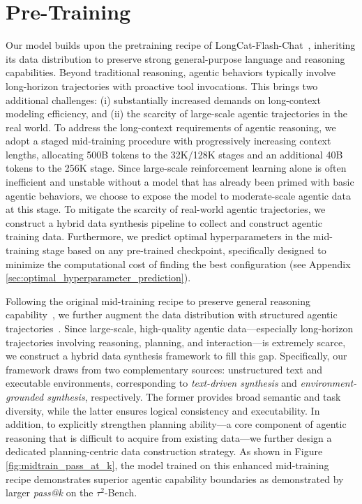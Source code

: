 \documentclass{article}
\begin{document}
\section{Pre-Training}
\label{sec:mid_training}
Our model builds upon the pretraining recipe of LongCat-Flash-Chat~\citep{longcat-flash}, inheriting its data distribution to preserve strong general-purpose language and reasoning capabilities.
Beyond traditional reasoning, agentic behaviors typically involve long-horizon trajectories with proactive tool invocations.
This brings two additional challenges: (i) substantially increased demands on long-context modeling efficiency, and (ii) the scarcity of large-scale agentic trajectories in the real world.
To address the long-context requirements of agentic reasoning, we adopt a staged mid-training procedure with progressively increasing context lengths, allocating 500B tokens to the 32K/128K stages and an additional 40B tokens to the 256K stage.
Since large-scale reinforcement learning alone is often inefficient and unstable without a model that has already been primed with basic agentic behaviors, we choose to expose the model to moderate-scale agentic data at this stage.
To mitigate the scarcity of real-world agentic trajectories, we construct a hybrid data synthesis pipeline to collect and construct agentic training data.
Furthermore, we predict optimal hyperparameters in the mid-training stage based on any pre-trained checkpoint, specifically designed to minimize the computational cost of finding the best configuration (see Appendix \ref{sec:optimal_hyperparameter_prediction}).

Following the original mid-training recipe to preserve general reasoning capability~\citep{zhang2025expanding,tu2025survey}, we further augment the data distribution with structured agentic trajectories~\citep{xu2026unlocking}.
Since large-scale, high-quality agentic data—especially long-horizon trajectories involving reasoning, planning, and interaction—is extremely scarce, we construct a hybrid data synthesis framework to fill this gap.
Specifically, our framework draws from two complementary sources: unstructured text and executable environments, corresponding to \textit{text-driven synthesis} and \textit{environment-grounded synthesis}, respectively.
The former provides broad semantic and task diversity, while the latter ensures logical consistency and executability.
In addition, to explicitly strengthen planning ability—a core component of agentic reasoning that is difficult to acquire from existing data—we further design a dedicated planning-centric data construction strategy. As shown in Figure \ref{fig:midtrain_pass_at_k}, the model trained on this enhanced mid-training recipe demonstrates superior agentic capability boundaries as demonstrated by larger \textit{pass@k} on the $\tau^2$-Bench.
\end{document}
